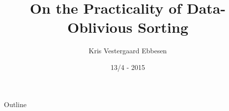 \documentclass[table]{beamer}
\title{On the Practicality of Data-Oblivious Sorting}
\author{Kris Vestergaard Ebbesen}
\date{13/4 - 2015}
\begin{document}
\begin{frame}
  \titlepage
\end{frame}

\begin{frame}{Outline}
  \tableofcontents
\end{frame}






%







%
\end{document}
